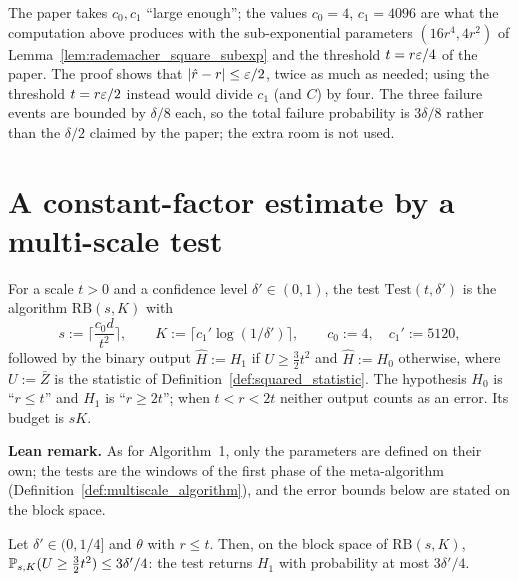 \begin{remark}\label{rem:norm_additive_constants}
The paper takes $c_0, c_1$ ``large enough''; the values $c_0 = 4$, $c_1 = 4096$ are what the
computation above produces with the sub-exponential parameters $(16r^4, 4r^2)$ of
Lemma~\ref{lem:rademacher_square_subexp} and the threshold $t = r\varepsilon/4$ of the paper. The
proof shows that $|\hat r - r| \le \varepsilon/2$, twice as much as needed; using the threshold
$t = r\varepsilon/2$ instead would divide $c_1$ (and $C$) by four. The three failure events are
bounded by $\delta/8$ each, so the total failure probability is $3\delta/8$ rather than the
$\delta/2$ claimed by the paper; the extra room is not used.
\end{remark}

\section{A constant-factor estimate by a multi-scale test}
\label{sec:norm_test}

\begin{definition}\label{def:scale_test}
\leanok
{}
For a scale $t > 0$ and a confidence level $\delta' \in (0,1)$, the test
$\mathrm{Test}(t,\delta')$ is the algorithm $\mathrm{RB}(s,K)$ with
\[
  s := \Big\lceil \frac{c_0 d}{t^2} \Big\rceil, \qquad
  K := \big\lceil c_1' \log(1/\delta') \big\rceil, \qquad
  c_0 := 4, \quad c_1' := 5120 ,
\]
followed by the binary output $\hat H := H_1$ if $U \ge \tfrac32 t^2$ and $\hat H := H_0$
otherwise, where $U := \bar Z$ is the statistic of Definition~\ref{def:squared_statistic}.
The hypothesis $H_0$ is ``$r \le t$'' and $H_1$ is ``$r \ge 2t$''; when $t < r < 2t$ neither
output counts as an error. Its budget is $sK$.
\end{definition}

\textbf{Lean remark.} As for Algorithm~1, only the parameters are defined on their own; the
tests are the windows of the first phase of the meta-algorithm
(Definition~\ref{def:multiscale_algorithm}), and the error bounds below are stated on the
block space.

\begin{lemma}\label{lem:test_error_h0}
\leanok
{}
Let $\delta' \in (0,1/4]$ and $\theta$ with $r \le t$. Then, on the block space of
$\mathrm{RB}(s,K)$, $\mathbb{P}_{s,K}(U \ge \tfrac32 t^2) \le 3\delta'/4$: the test returns $H_1$
with probability at most $3\delta'/4$.
\end{lemma}

